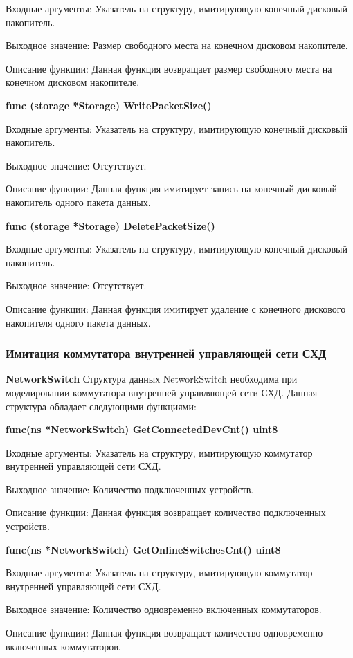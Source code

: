 Входные аргументы: Указатель на структуру, имитирующую конечный дисковый накопитель.

Выходное значение: Размер свободного места на конечном дисковом накопителе.

Описание функции: Данная функция возвращает размер свободного места на конечном дисковом накопителе.

\textbf{func (storage *Storage) WritePacketSize() }

Входные аргументы: Указатель на структуру, имитирующую конечный дисковый накопитель.

Выходное значение: Отсутствует.

Описание функции: Данная функция имитирует запись на конечный дисковый накопитель одного пакета данных.

\textbf{func (storage *Storage) DeletePacketSize()}

Входные аргументы: Указатель на структуру, имитирующую конечный дисковый накопитель.

Выходное значение: Отсутствует.

Описание функции: Данная функция имитирует удаление с конечного дискового накопителя одного пакета данных.

\subsubsection{Имитация коммутатора внутренней управляющей сети СХД}
\textbf{NetworkSwitch}
Структура данных NetworkSwitch необходима при моделировании коммутатора внутренней управляющей сети СХД. Данная структура обладает следующими функциями:

\textbf{func(ns *NetworkSwitch) GetConnectedDevCnt() uint8}

Входные аргументы: Указатель на структуру, имитирующую коммутатор внутренней управляющей сети СХД.

Выходное значение: Количество подключенных устройств.

Описание функции: Данная функция возвращает количество подключенных устройств.

\textbf{func(ns *NetworkSwitch) GetOnlineSwitchesCnt() uint8}

Входные аргументы: Указатель на структуру, имитирующую коммутатор внутренней управляющей сети СХД.

Выходное значение: Количество одновременно включенных коммутаторов.

Описание функции: Данная функция возвращает количество одновременно включенных коммутаторов.

